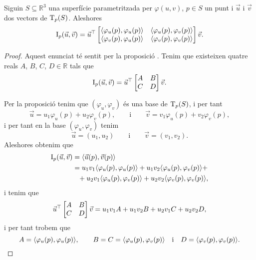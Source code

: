 \documentclass[../../Main.tex]{subfiles}
\begin{document}
	\begin{proposition}
		\label{prop:coeficients de la primera forma fonamental}
		Siguin \(S\subseteq\mathbb{R}^{3}\) una superfície parametritzada per \(\varphi(u,v)\), \(p\in S\) un punt i \(\vec{u}\) i \(\vec{v}\) dos vectors de \(\operatorname{T}_{p}(S)\). Aleshores
		\[\I_{p}(\vec{u},\vec{v})=\vec{u}^{\transposta}\begin{bmatrix}
			\prodesc{\varphi_{u}(p)}{\varphi_{u}(p)} & \prodesc{\varphi_{u}(p)}{\varphi_{v}(p)} \\
			\prodesc{\varphi_{v}(p)}{\varphi_{u}(p)} & \prodesc{\varphi_{v}(p)}{\varphi_{v}(p)}
		\end{bmatrix}\vec{v}.\]
		\begin{proof}
			Aquest enunciat té sentit per la proposició . Tenim que existeixen quatre reals \(A\), \(B\), \(C\), \(D\in\mathbb{R}\) tals que
			\[\I_{p}(\vec{u},\vec{v})=\vec{u}^{\transposta}\begin{bmatrix}
				A & B \\
				C & D
			\end{bmatrix}\vec{v}.\]
			
			Per la proposició  tenim que \((\varphi_{u},\varphi_{v})\) és una base de \(\operatorname{T}_{p}(S)\), i per tant
			\[\vec{u}=u_{1}\varphi_{u}(p)+u_{2}\varphi_{v}(p),\qquad\text{i}\qquad\vec{v}=v_{1}\varphi_{u}(p)+v_{2}\varphi_{v}(p),\]
			i per tant en la base \((\varphi_{u},\varphi_{v})\) tenim
			\[\vec{u}=(u_{1},u_{2})\qquad\text{i}\qquad\vec{v}=(v_{1},v_{2}).\]
			Aleshores obtenim que
			\begin{align*}
				\I_{p}(\vec{u},\vec{v})&=\prodesc{\vec{u}(p)}{\vec{v}(p)} \\
				&=u_{1}v_{1}\prodesc{\varphi_{u}(p)}{\varphi_{u}(p)}+u_{1}v_{2}\prodesc{\varphi_{u}(p)}{\varphi_{v}(p)}+\\
				&\phantom{=}+u_{2}v_{1}\prodesc{\varphi_{u}(p)}{\varphi_{v}(p)}+u_{2}v_{2}\prodesc{\varphi_{v}(p)}{\varphi_{v}(p)},
			\end{align*}
			i tenim que
			\[\vec{u}^{\top}\begin{bmatrix}
				A & B \\
				C & D
			\end{bmatrix}\vec{v}=u_{1}v_{1}A+u_{1}v_{2}B+u_{2}v_{1}C+u_{2}v_{2}D,\]
			i per tant trobem que
			\[A=\prodesc{\varphi_{u}(p)}{\varphi_{u}(p)},\qquad B=C=\prodesc{\varphi_{u}(p)}{\varphi_{v}(p)}\quad\text{i}\quad D=\prodesc{\varphi_{v}(p)}{\varphi_{v}(p)}.\qedhere\]
		\end{proof}
	\end{proposition}
\end{document}
